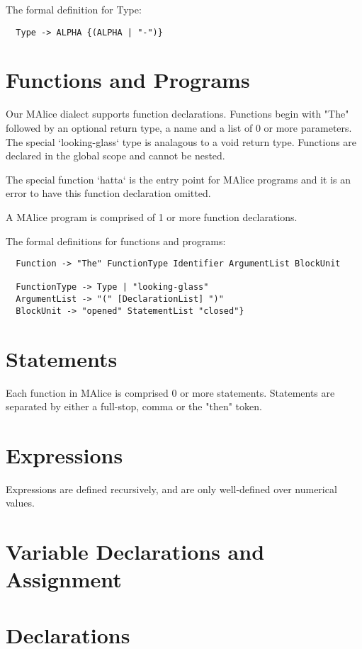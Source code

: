 \documentclass[a4wide, 11pt]{article}
\begin{document}
The formal definition for Type:
\begin{verbatim}
  Type -> ALPHA {(ALPHA | "-")}
\end{verbatim}

\section{Functions and Programs}

Our MAlice dialect supports function declarations. Functions begin with "The" followed by an optional return type, a name and a list of 0 or more parameters. The special `looking-glass` type is analagous to a void return type. Functions are declared in the global scope and cannot be nested.

The special function `hatta` is the entry point for MAlice programs and it is an error to have this function declaration omitted.

A MAlice program is comprised of 1 or more function declarations.

The formal definitions for functions and programs:

\begin{verbatim}
  Function -> "The" FunctionType Identifier ArgumentList BlockUnit

  FunctionType -> Type | "looking-glass"
  ArgumentList -> "(" [DeclarationList] ")"
  BlockUnit -> "opened" StatementList "closed"}
\end{verbatim}

\section{Statements}

Each function in MAlice is comprised 0 or more statements. Statements are separated by either a full-stop, comma or the "then" token.
  
\section{Expressions}

Expressions are defined recursively, and are only well-defined over numerical values.

\section{Variable Declarations and Assignment}

\section{Declarations}
\end{document}
